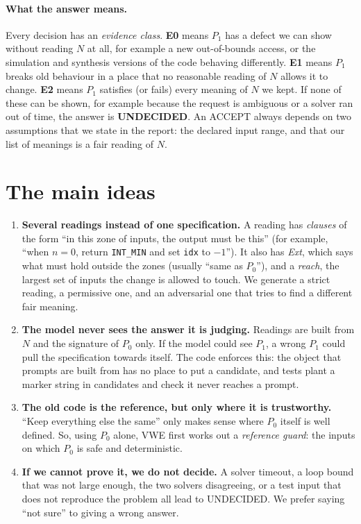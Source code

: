 \documentclass[10pt,a4paper]{article}
\newcommand{\Pz}{P_0}\newcommand{\Po}{P_1}
\begin{document}
\paragraph{What the answer means.} Every decision has an \emph{evidence class}.
\textbf{E0} means $\Po$ has a defect we can show without reading $N$ at all, for example a new
out-of-bounds access, or the simulation and synthesis versions of the code behaving differently.
\textbf{E1} means $\Po$ breaks old behaviour in a place that no reasonable reading of $N$ allows
it to change. \textbf{E2} means $\Po$ satisfies (or fails) every meaning of $N$ we kept. If none
of these can be shown, for example because the request is ambiguous or a solver ran out of
time, the answer is \textbf{UNDECIDED}. An ACCEPT always depends on two assumptions that we state
in the report: the declared input range, and that our list of meanings is a fair reading of $N$.

\section{The main ideas}
\begin{enumerate}
\item \textbf{Several readings instead of one specification.} A reading has \emph{clauses} of the
form ``in this zone of inputs, the output must be this'' (for example, ``when $n=0$, return
\texttt{INT\_MIN} and set \texttt{idx} to $-1$''). It also has \emph{Ext}, which says what must hold
outside the zones (usually ``same as $\Pz$''), and a \emph{reach}, the largest set of inputs the
change is allowed to touch. We generate a strict reading, a permissive one, and an adversarial one
that tries to find a different fair meaning.
\item \textbf{The model never sees the answer it is judging.} Readings are built from $N$ and the
signature of $\Pz$ only. If the model could see $\Po$, a wrong $\Po$ could pull the specification
towards itself. The code enforces this: the object that prompts are built from has no place to put
a candidate, and tests plant a marker string in candidates and check it never reaches a prompt.
\item \textbf{The old code is the reference, but only where it is trustworthy.} ``Keep everything
else the same'' only makes sense where $\Pz$ itself is well defined. So, using $\Pz$ alone, VWE
first works out a \emph{reference guard}: the inputs on which $\Pz$ is safe and deterministic.
\item \textbf{If we cannot prove it, we do not decide.} A solver timeout, a loop bound that was not
large enough, the two solvers disagreeing, or a test input that does not reproduce the problem all
lead to UNDECIDED. We prefer saying ``not sure'' to giving a wrong answer.
\end{enumerate}
\end{document}
